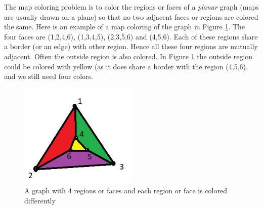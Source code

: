 The map coloring problem is to color the regions or faces of a \emph{planar} graph (maps are usually drawn on a plane) so that no two adjacent faces or regions are colored the same. Here is an example of a map coloring
of the graph in Figure \ref{10g8}. The four faces are (1,2,4,6), (1,3,4,5), (2,3,5,6) and (4,5,6). Each of these regions share a border (or an edge) with other region. Hence all these four regions are mutually adjacent. Often the outside region is also colored. In Figure \ref{10g8} the outside region could be colored with yellow (as it does share a border with the region (4,5,6). and we still need four colors.
\begin{figure}
\begin{center}
\includegraphics[width=0.5\textwidth]{mapcolor.JPG}
\end{center}
\caption{A graph with 4 regions or faces and each region or face is colored differently}\label{10g8}
\end{figure}

